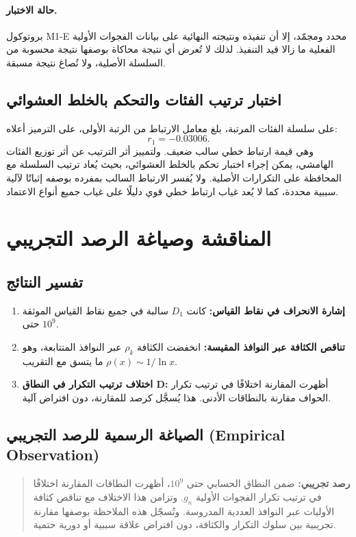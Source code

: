 \documentclass[12pt,a4paper]{article}
\begin{document}
\paragraph{حالة الاختبار.}
بروتوكول \textenglish{M1-E} محدد ومجمّد، إلا أن تنفيذه ونتيجته النهائية على بيانات الفجوات الأولية الفعلية ما زالا قيد التنفيذ. لذلك لا تُعرض أي نتيجة محاكاة بوصفها نتيجة محسوبة من السلسلة الأصلية، ولا تُصاغ نتيجة مسبقة.

\subsection{اختبار ترتيب الفئات والتحكم بالخلط العشوائي}
على سلسلة الفئات المرتبة، بلغ معامل الارتباط من الرتبة الأولى، على الترميز أعلاه:
\[
r_1=-0.03006.
\]
وهي قيمة ارتباط خطي سالب ضعيف. ولتمييز أثر الترتيب عن أثر توزيع الفئات الهامشي، يمكن إجراء اختبار تحكم بالخلط العشوائي، بحيث يُعاد ترتيب السلسلة مع المحافظة على التكرارات الأصلية. ولا يُفسر الارتباط السالب بمفرده بوصفه إثباتًا لآلية سببية محددة، كما لا يُعد غياب ارتباط خطي قوي دليلًا على غياب جميع أنواع الاعتماد.

\section{المناقشة وصياغة الرصد التجريبي}
\subsection{تفسير النتائج}
\begin{enumerate}
\item \textbf{إشارة الانحراف في نقاط القياس:} كانت $D_1$ سالبة في جميع نقاط القياس الموثقة حتى $10^9$.
\item \textbf{تناقص الكثافة عبر النوافذ المقيسة:} انخفضت الكثافة $\rho_k$ عبر النوافذ المتتابعة، وهو ما يتسق مع التقريب $\rho(x) \sim 1/\ln x$.
\item \textbf{اختلاف ترتيب التكرار في النطاق \textenglish{D}:} أظهرت المقارنة اختلافًا في ترتيب تكرار الحواف مقارنة بالنطاقات الأدنى. هذا يُسجَّل كرصد للمقارنة، دون افتراض آلية.
\end{enumerate}
\subsection{الصياغة الرسمية للرصد التجريبي (\textenglish{Empirical Observation})}
\begin{quote}
\textbf{رصد تجريبي:} ضمن النطاق الحسابي حتى $10^9$، أظهرت النطاقات المقارنة اختلافًا في ترتيب تكرار الفجوات الأولية $g_n$. وتزامن هذا الاختلاف مع تناقص كثافة الأوليات عبر النوافذ العددية المدروسة. وتُسجّل هذه الملاحظة بوصفها مقارنة تجريبية بين سلوك التكرار والكثافة، دون افتراض علاقة سببية أو دورية حتمية.
\end{quote}
\end{document}
